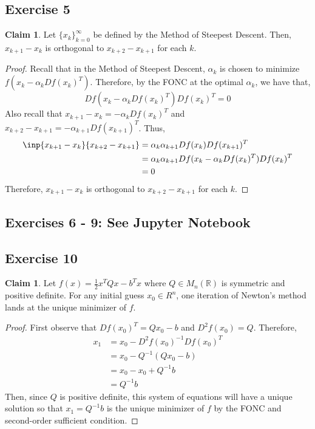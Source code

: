 \documentclass[letterpaper,12pt]{article}
\theoremstyle{definition}
\newtheorem{claim}[theorem]{Claim}
\begin{document}
\subsection*{Exercise 5}
\begin{claim}
Let $\{x_k\}_{k=0}^{\infty}$ be defined by the Method of Steepest Descent. Then, $x_{k+1} - x_k$ is orthogonal to $x_{k+2} - x_{k+1}$ for each $k$. 
\end{claim}
\begin{proof}
Recall that in the Method of Steepest Descent, $\alpha_k$ is chosen to minimize $f(x_k - \alpha_k Df(x_k)^T)$. Therefore, by the FONC at the optimal $\alpha_k$, we have that,
\begin{equation}
Df(x_k - \alpha_k Df(x_k)^T) Df(x_k)^T = 0
\end{equation}
Also recall that $x_{k+1} - x_k = -\alpha_k Df(x_k)^T$ and $x_{k+2} - x_{k+1} =  -\alpha_{k+1} Df(x_{k+1})^T$. Thus,
\begin{align*}
\inp{x_{k+1} - x_k}{x_{k+2} - x_{k+1}} &= \alpha_k \alpha_{k+1} Df(x_k) Df(x_{k+1})^T \\
&= \alpha_k \alpha_{k+1} Df(x_k - \alpha_k Df(x_k)^T) Df(x_k)^T \\
&= 0 
\end{align*}
Therefore, $x_{k+1} - x_k$ is orthogonal to $x_{k+2} - x_{k+1}$ for each $k$. 
\end{proof}

\subsection*{Exercises 6 - 9: See Jupyter Notebook}

\subsection*{Exercise 10}
\begin{claim}
Let $f(x) = \frac{1}{2} x^T Q x - b^T x$ where $Q \in M_n (\mathbb{R})$ is symmetric and positive definite. For any initial guess $x_0 \in R^n$, one iteration of Newton's method lands at the unique minimizer of $f$. 
\end{claim}
\begin{proof}
First observe that $Df(x_0)^T = Qx_0 - b$ and $D^2f(x_0) = Q$. Therefore, 
\begin{align*}
x_1 &= x_0 - D^2f(x_0)^{-1} Df(x_0)^T \\
&= x_0 - Q^{-1} (Qx_0 - b) \\
&= x_0 - x_0 +  Q^{-1}b \\
&= Q^{-1}b
\end{align*}
Then, since $Q$ is positive definite, this system of equations will have a unique solution so that $x_1 = Q^{-1}b$ is the unique minimizer of $f$ by the FONC and second-order sufficient condition. 
\end{proof}
\end{document}
